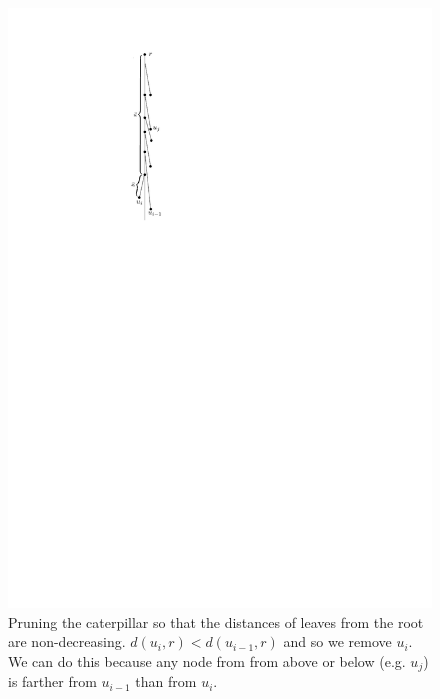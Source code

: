 \documentclass[11pt,a4paper]{article}
\theoremstyle{definition}
\theoremstyle{remark}
\begin{document}
\begin{enumerate}
\begin{figure}
\begin{center}
\includegraphics[scale=1]{caterpillar}
\end{center}
\caption{Pruning the caterpillar so that the distances of leaves from the root are non-decreasing. $d(u_i,r)<d(u_{i-1},r)$ and so we remove $u_{i}$. We can do this because any node from from above or below (e.g. $u_j$) is farther from $u_{i-1}$ than from $u_i$.}
\end{figure}


\end{enumerate}
\end{document}
